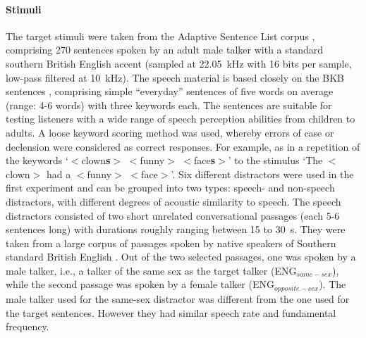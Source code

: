 \documentclass[a4paper, twoside]{templates/ociamthesis}
\begin{document}
\hypertarget{stimuli}{%
\paragraph{Stimuli}\label{stimuli}}

\hfill\break
The target stimuli were taken from the Adaptive Sentence List corpus \autocite[ASL;][]{MacLeod1990}, comprising 270 sentences spoken by an adult male talker with a standard southern British English accent (sampled at 22.05~kHz with 16 bits per sample, low-pass filtered at 10~kHz). The speech material is based closely on the BKB sentences \autocite{Bench1979}, comprising simple ``everyday'' sentences of five words on average (range: 4-6 words) with three keywords each. The sentences are suitable for testing listeners with a wide range of speech perception abilities from children to adults. A loose keyword scoring method was used, whereby errors of case or declension were considered as correct responses. For example, as in a repetition of the keywords `\(<\)clown\textbf{s}\(>\) \(<\)funny\(>\) \(<\)face\textbf{s}\(>\)' to the stimulus `The \(<\)clown\(>\) had a \(<\)funny\(>\) \(<\)face\(>\)'. Six different distractors were used in the first experiment and can be grouped into two types: speech- and non-speech distractors, with different degrees of acoustic similarity to speech. The speech distractors consisted of two short unrelated conversational passages (each 5-6 sentences long) with durations roughly ranging between 15 to 30~s. They were taken from a large corpus of passages spoken by native speakers of Southern standard British English \autocite[EUROM corpus;][]{Chan1995}. Out of the two selected passages, one was spoken by a male talker, i.e., a talker of the same sex as the target talker (ENG\(_{same-sex}\)), while the second passage was spoken by a female talker (ENG\(_{opposite-sex}\)). The male talker used for the same-sex distractor was different from the one used for the target sentences. However they had similar speech rate and fundamental frequency.\\
\end{document}
